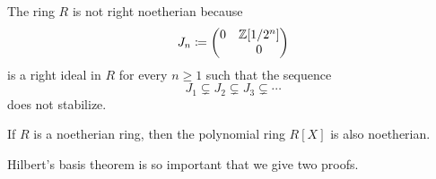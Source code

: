 \begin{example}
\begin{enumerate}
      The ring $R$ is not right noetherian because
      \[
                  J_n
        \coloneqq  \begin{pmatrix}
                    0 & \mathbb{Z}[1/2^n] \\
                      & 0
                  \end{pmatrix}
      \]
      is a right ideal in $R$ for every $n \geq 1$ such that the sequence
      \[
                    J_1
        \subsetneq  J_2
        \subsetneq  J_3
        \subsetneq  \dotsb
      \]
      does not stabilize.
  \end{enumerate}
\end{example}



\begin{theorem}
  \label{theorem: Hilberts basis theorem}
  If $R$ is a noetherian ring, then the polynomial ring $R[X]$ is also noetherian.
\end{theorem}


\begin{fluff}
  Hilbert’s basis theorem is so important that we give two proofs.
\end{fluff}


